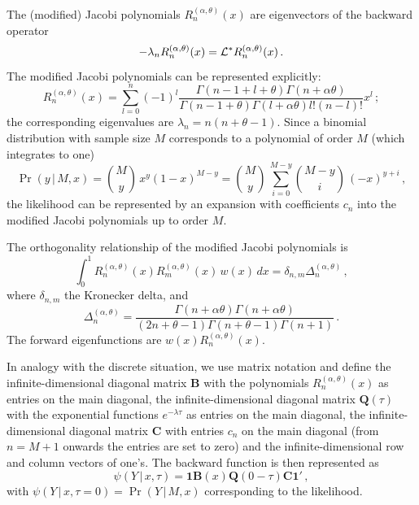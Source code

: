 \documentclass[preprint]{elsarticle}
\newcommand\given{{\,|\,}}
\newcommand\y{\ensuremath{Y}}
\newcommand\oneC{\ensuremath{\mathbf{1}'}}
\newcommand\oneR{\ensuremath{\mathbf{1}}}
\begin{document}
The (modified) Jacobi polynomials $R_n^{(\alpha,\theta)}(x)$ are eigenvectors of the backward operator
\begin{equation}
    -\lambda_n R_n^{(\alpha,\theta)}(x)={\cal L}^{*}R_n^{(\alpha,\theta)}(x)\,.
\end{equation}
The modified Jacobi polynomials can be represented explicitly:
\begin{equation}
  R_n^{(\alpha,\theta)}(x)=\sum_{l=0}^n(-1)^l\frac{\Gamma(n-1+l+\theta)\Gamma(n+\alpha\theta)}{\Gamma(n-1+\theta)\Gamma(l+\alpha\theta)l!(n-l)!}x^l\,;
\end{equation}
the corresponding eigenvalues are $\lambda_n=n(n+\theta-1)$. Since a binomial distribution with sample size $M$ corresponds to a polynomial of order $M$ (which integrates to one) 
\begin{equation}
\Pr(y\given M,x)=\binom{M}{y}\,x^{y}(1-x)^{M-y}
=\binom{M}{y}\,\sum_{i=0}^{M-y} \binom{M-y}{i}\,(-x)^{y+i}\,,
\end{equation}
the likelihood can be represented by an expansion with coefficients $c_n$ into the modified Jacobi polynomials up to order $M$. 

The orthogonality relationship of the modified Jacobi polynomials is
\begin{equation}\label{eq:ortho_Jacobi}
    \int_0^1 R_n^{(\alpha,\theta)}(x) R_m^{(\alpha,\theta)}(x)\, w(x)\,dx=\delta_{n,m} \Delta_n^{(\alpha,\theta)}\,,
\end{equation}
where $\delta_{n,m}$ the Kronecker delta, and 
\begin{equation}
    \Delta_n^{(\alpha,\theta)}=\frac{\Gamma(n+\alpha\theta)\Gamma(n+\alpha\theta)}{(2n+\theta-1)\Gamma(n+\theta-1)\Gamma(n+1)}\,.
\end{equation}
The forward eigenfunctions are $w(x)R_n^{(\alpha,\theta)}(x)$.   

In analogy with the discrete situation, we use matrix notation and define the infinite-dimensional diagonal matrix $\mathbf{B}$ with the polynomials $R_n^{(\alpha,\theta)}(x)$ as entries on the main diagonal, the infinite-dimensional diagonal matrix $\mathbf{Q}(\tau)$ with the exponential functions $e^{-\lambda\tau}$ as entries on the main diagonal, the infinite-dimensional diagonal matrix $\mathbf{C}$ with entries $c_n$ on the main diagonal (from $n=M+1$ onwards the entries are set to zero) and the infinite-dimensional row and column vectors of one's. The backward function is then represented as
\begin{equation}
\psi(\y\given x,\tau)=\oneR\mathbf{B}(x)\mathbf{Q}(0-\tau)\mathbf{C}\oneC\,,
\end{equation}
with $\psi(\y\given x,\tau=0)=\Pr(\y\given M,x)$ corresponding to the likelihood.
\end{document}
